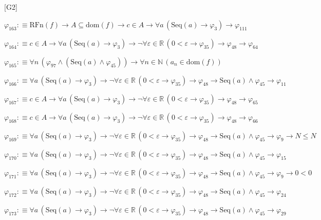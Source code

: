 \begin{fullproof}{[G2]}
\begin{abbrevlist}
\item $\varphi_{163} :\equiv \mathrm{RFn}(f) \to A \subseteq \mathrm{dom}(f) \to c \in A \to \forall a\,(\mathrm{Seq}(a) \to \varphi_{3}) \to \varphi_{111}$
\item $\varphi_{164} :\equiv c \in A \to \forall a\,(\mathrm{Seq}(a) \to \varphi_{3}) \to \neg \forall \varepsilon \in \mathbb{R}\,(0 < \varepsilon \to \varphi_{35}) \to \varphi_{48} \to \varphi_{64}$
\item $\varphi_{165} :\equiv \forall n\,(\varphi_{97} \land (\mathrm{Seq}(a) \land \varphi_{45})) \to \forall n \in \mathbb{N}\,(a_{n} \in \mathrm{dom}(f))$
\item $\varphi_{166} :\equiv \forall a\,(\mathrm{Seq}(a) \to \varphi_{3}) \to \neg \forall \varepsilon \in \mathbb{R}\,(0 < \varepsilon \to \varphi_{35}) \to \varphi_{48} \to \mathrm{Seq}(a) \land \varphi_{45} \to \varphi_{11}$
\item $\varphi_{167} :\equiv c \in A \to \forall a\,(\mathrm{Seq}(a) \to \varphi_{3}) \to \neg \forall \varepsilon \in \mathbb{R}\,(0 < \varepsilon \to \varphi_{35}) \to \varphi_{48} \to \varphi_{65}$
\item $\varphi_{168} :\equiv c \in A \to \forall a\,(\mathrm{Seq}(a) \to \varphi_{3}) \to \neg \forall \varepsilon \in \mathbb{R}\,(0 < \varepsilon \to \varphi_{35}) \to \varphi_{48} \to \varphi_{66}$
\item $\varphi_{169} :\equiv \forall a\,(\mathrm{Seq}(a) \to \varphi_{3}) \to \neg \forall \varepsilon \in \mathbb{R}\,(0 < \varepsilon \to \varphi_{35}) \to \varphi_{48} \to \mathrm{Seq}(a) \land \varphi_{45} \to \varphi_{9} \to N \leq N$
\item $\varphi_{170} :\equiv \forall a\,(\mathrm{Seq}(a) \to \varphi_{3}) \to \neg \forall \varepsilon \in \mathbb{R}\,(0 < \varepsilon \to \varphi_{35}) \to \varphi_{48} \to \mathrm{Seq}(a) \land \varphi_{45} \to \varphi_{15}$
\item $\varphi_{171} :\equiv \forall a\,(\mathrm{Seq}(a) \to \varphi_{3}) \to \neg \forall \varepsilon \in \mathbb{R}\,(0 < \varepsilon \to \varphi_{35}) \to \varphi_{48} \to \mathrm{Seq}(a) \land \varphi_{45} \to \varphi_{9} \to 0 < 0$
\item $\varphi_{172} :\equiv \forall a\,(\mathrm{Seq}(a) \to \varphi_{3}) \to \neg \forall \varepsilon \in \mathbb{R}\,(0 < \varepsilon \to \varphi_{35}) \to \varphi_{48} \to \mathrm{Seq}(a) \land \varphi_{45} \to \varphi_{24}$
\item $\varphi_{173} :\equiv \forall a\,(\mathrm{Seq}(a) \to \varphi_{3}) \to \neg \forall \varepsilon \in \mathbb{R}\,(0 < \varepsilon \to \varphi_{35}) \to \varphi_{48} \to \mathrm{Seq}(a) \land \varphi_{45} \to \varphi_{29}$

\end{abbrevlist}
\end{fullproof}

